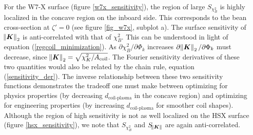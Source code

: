 \documentclass[aps,unsortedaddress]{revtex4-1}
\begin{document}
For the W7-X surface (figure \ref{w7x_sensitivity}), the region of large $S_{\chi^2_B}$ is highly localized in the concave region on the inboard side. This corresponds to the bean cross-section at $\zeta' = 0$ (see figure \ref{fig_w7x}, subplot a). The surface sensitivity of $\norm{\bm{K}}_2$ is anti-correlated with that of $\chi^2_B$. This can be understood in light of equation (\ref{regcoil_minimization}). As $\partial \chi^2_B/\partial \Phi_k$ increases $\partial \norm{\bm{K}}_2/\partial \Phi_k$ must decrease, since $\norm{\bm{K}}_2 = \sqrt{ \chi^2_K/A_{\text{coil}}}$. The Fourier sensitivity derivatives of these two quantities would also be related by the chain rule, equation (\ref{sensitivity_der}). The inverse relationship between these two sensitivity functions demonstrates the tradeoff one must make between optimizing for physics properties (by decreasing $d_{\text{coil-plasma}}$ in the concave region) and optimizing for engineering properties (by increasing $d_{\text{coil-plasma}}$ for smoother coil shapes). Although the region of high sensitivity is not as well localized on the HSX surface (figure \ref{hsx_sensitivity}), we note that $S_{\chi^2_B}$ and $S_{\norm{\bm{K}}}$ are again anti-correlated. 
\end{document}
